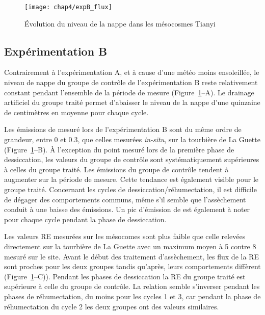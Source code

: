 

\begin{figure}
\centering
\texttt{[image: chap4/expB\_flux]}
\caption{Évolution du niveau de la nappe dans les mésocosmes Tianyi}
\label{fig:HMty}
\end{figure}

\subsection{Expérimentation B}

Contrairement à l'expérimentation A, et à cause d'une météo moins ensoleillée, le niveau de nappe du groupe de contrôle de l'expérimentation B reste relativement constant pendant l'ensemble de la période de mesure (Figure~\ref{fig:HMty}--A).
Le drainage artificiel du groupe traité permet d'abaisser le niveau de la nappe d'une quinzaine de centimètres en moyenne pour chaque cycle.

Les émissions de \chh mesuré lors de l'expérimentation B sont du même ordre de grandeur, entre 0 et \SI{0.3}{\uml}, que celles mesurées \textit{in-situ}, sur la tourbière de La Guette (Figure~\ref{fig:HMty}--B).
À l'exception du point mesuré lors de la première phase de dessiccation, les valeurs du groupe de contrôle sont systématiquement supérieures à celles du groupe traité.
Les émissions du groupe de contrôle tendent à augmenter sur la période de mesure.
Cette tendance est également visible pour le groupe traité.
Concernant les cycles de dessiccation/réhumectation, il est difficile de dégager des comportements communs, même s'il semble que l'assèchement conduit à une baisse des émissions.
Un pic d'émission de \chh est également à noter pour chaque cycle pendant la phase de dessiccation.

Les valeurs RE mesurées sur les mésocomes sont plus faible que celle relevées directement sur la tourbière de La Guette avec un maximum moyen à 5 contre \SI{8}{\uml} mesuré sur le site.
Avant le début des traitement d'assèchement, les flux de la RE sont proches pour les deux groupes tandis qu'après, leurs comportements diffèrent (Figure~\ref{fig:HMty}--C)).
Pendant les phases de dessiccation la RE du groupe traité est supérieure à celle du groupe de contrôle.
La relation semble s'inverser pendant les phases de réhumectation, du moins pour les cycles 1 et 3, car pendant la phase de réhumectation du cycle 2 les deux groupes ont des valeurs similaires.



